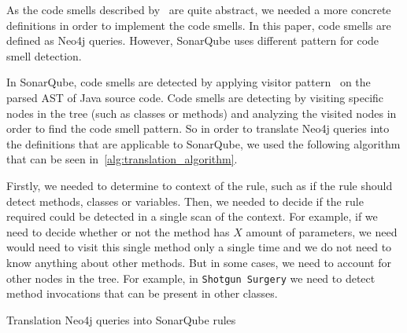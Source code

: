 As the code smells described by~\citeauthor{refactoring-fowler} are quite abstract, we needed
a more concrete definitions in order to implement the code smells.
In this paper, code smells are defined as Neo4j queries.
However, SonarQube uses different pattern for code smell detection.

In SonarQube, code smells are detected by applying visitor pattern~\cite{visitor_pattern} on the parsed
AST of Java source code.
Code smells are detecting by visiting specific nodes in the tree (such as classes or methods) and analyzing
the visited nodes in order to find the code smell pattern.
So in order to translate Neo4j queries into the definitions that are applicable to SonarQube, we used the following
algorithm that can be seen in~\ref{alg:translation_algorithm}.

Firstly, we needed to determine to context of the rule, such as if the rule should detect methods, classes or variables.
Then, we needed to decide if the rule required could be detected in a single scan of the context.
For example, if we need to decide whether or not the method has $X$ amount of parameters, we need would need to visit
this single method only a single time and we do not need to know anything about other methods.
But in some cases, we need to account for other nodes in the tree.
For example, in \verb|Shotgun Surgery| we need to detect method invocations that can be present in other classes.

\begin{algorithm} [!htb]
    \caption{Translation Neo4j queries into SonarQube rules}
    \label{alg:translation_algorithm}
    \BlankLine

\end{algorithm}

